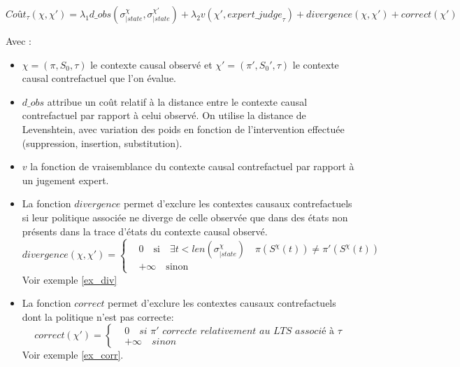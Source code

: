 \documentclass[11pt]{extarticle}
\begin{document}
\begin{equation}\label{cout}
    \textit{Coût}_\tau(\chi,\chi')= \lambda_1  d\_obs(\sigma^\chi_{|state},\sigma^{\chi'}_{|state}) + \lambda_2 v(\chi', expert\_{judge}_\tau) + divergence(\chi,\chi') + correct(\chi') 
\end{equation}

Avec :
\begin{itemize}
    \item $\chi= (\pi,S_0,\tau)$ le contexte causal observé et $\chi' = (\pi',S_0',\tau)$ le contexte causal contrefactuel que l'on évalue. 
    \item $d\_obs$ attribue un coût relatif à la distance entre le contexte causal contrefactuel par rapport à celui observé. On utilise la distance de Levenshtein, avec variation des poids en fonction de l'intervention effectuée (suppression, insertion, substitution).
    \item $v$ la fonction de vraisemblance du contexte causal contrefactuel par rapport à un jugement expert.
    \item La fonction $divergence$ permet d'exclure les contextes causaux contrefactuels si leur politique associée ne diverge de celle observée que dans des états non présents dans la trace d'états du contexte causal observé. 
    \begin{equation}
        divergence(\chi,\chi') = \begin{cases}
             & 0 \quad \text{si} \quad \exists t<len(\sigma^{\chi}_{|state}) \quad \pi(S^\chi(t))\neq \pi'(S^{\chi}(t))
             \\
             &+\infty \quad \text{sinon}
        \end{cases}
    \end{equation}
    Voir exemple \ref{ex_div}

    \item La fonction $correct$ permet d'exclure les contextes causaux contrefactuels dont la politique n'est pas correcte:
    \begin{equation}
        correct(\chi') = \begin{cases}
            & 0 \quad \textit{si $\pi'$ correcte relativement au LTS associé à $\tau$} \\
            & +\infty \quad sinon
        \end{cases}
    \end{equation}
    Voir exemple \ref{ex_corr}.

\end{itemize}
\end{document}
